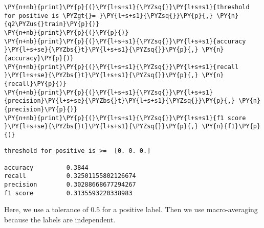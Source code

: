 \begin{tcolorbox}[breakable, size=fbox, boxrule=1pt, pad at break*=1mm,colback=cellbackground, colframe=cellborder]
\begin{Verbatim}[commandchars=\\\{\}]
\PY{n+nb}{print}\PY{p}{(}\PY{l+s+s1}{\PYZsq{}}\PY{l+s+s1}{threshold for positive is \PYZgt{}= }\PY{l+s+s1}{\PYZsq{}}\PY{p}{,} \PY{n}{q2\PYZus{}train}\PY{p}{)}
\PY{n+nb}{print}\PY{p}{(}\PY{p}{)}
\PY{n+nb}{print}\PY{p}{(}\PY{l+s+s1}{\PYZsq{}}\PY{l+s+s1}{accuracy }\PY{l+s+se}{\PYZbs{}t}\PY{l+s+s1}{\PYZsq{}}\PY{p}{,} \PY{n}{accuracy}\PY{p}{)}
\PY{n+nb}{print}\PY{p}{(}\PY{l+s+s1}{\PYZsq{}}\PY{l+s+s1}{recall   }\PY{l+s+se}{\PYZbs{}t}\PY{l+s+s1}{\PYZsq{}}\PY{p}{,} \PY{n}{recall}\PY{p}{)}
\PY{n+nb}{print}\PY{p}{(}\PY{l+s+s1}{\PYZsq{}}\PY{l+s+s1}{precision}\PY{l+s+se}{\PYZbs{}t}\PY{l+s+s1}{\PYZsq{}}\PY{p}{,} \PY{n}{precision}\PY{p}{)}
\PY{n+nb}{print}\PY{p}{(}\PY{l+s+s1}{\PYZsq{}}\PY{l+s+s1}{f1 score }\PY{l+s+se}{\PYZbs{}t}\PY{l+s+s1}{\PYZsq{}}\PY{p}{,} \PY{n}{f1}\PY{p}{)}
\end{Verbatim}
\end{tcolorbox}

    \begin{Verbatim}[commandchars=\\\{\}]
threshold for positive is >=  [0. 0. 0.]

accuracy         0.3844
recall           0.32501155802126674
precision        0.30288668677294267
f1 score         0.3135593220338983
    \end{Verbatim}

    Here, we use a tolerance of \(0.5\) for a positive label. Then we use
macro-averaging because the labels are independent.

